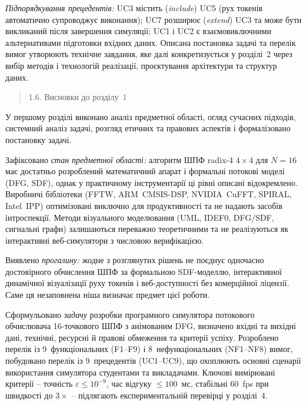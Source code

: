 \documentclass[
]{article}
\begin{document}
\emph{Підпорядкування прецедентів:} UC3 містить (\emph{include}) UC5
(рух токенів автоматично супроводжує виконання); UC7 розширює
(\emph{extend}) UC3 та може бути викликаний після завершення симуляції;
UC1 і UC2 є взаємовиключними альтернативами підготовки вхідних даних.
Описана постановка задачі та перелік вимог утворюють технічне завдання,
яке далі конкретизується у розділі~2 через вибір методів і технологій
реалізації, проєктування архітектури та структур даних.

\begin{quote}
\protect{}\label{ux432ux438ux441ux43dux43eux432ux43aux438-ux434ux43e-ux440ux43eux437ux434ux456ux43bux443-1}{}1.6.
Висновки до розділу~1
\end{quote}

У першому розділі виконано аналіз предметної області, огляд сучасних
підходів, системний аналіз задачі, розгляд етичних та правових аспектів
і формалізовано постановку задачі.

Зафіксовано \emph{стан предметної області:} алгоритм ШПФ radix-4
\(4 \times 4\) для \(N = 16\) має достатньо розроблений математичний
апарат і формальні потокові моделі (DFG, SDF), однак у практичному
інструментарії ці рівні описані відокремлено. Виробничі бібліотеки
(FFTW, ARM~CMSIS-DSP, NVIDIA~CuFFT, SPIRAL, Intel~IPP) оптимізовані
виключно для продуктивності та не надають засобів інтроспекції. Методи
візуального моделювання (UML, IDEF0, DFG/SDF, сигнальні графи)
залишаються переважно теоретичними та не реалізуються як інтерактивні
веб-симулятори з числовою верифікацією.

Виявлено \emph{прогалину:} жодне з розглянутих рішень не поєднує
одночасно достовірного обчислення ШПФ за формальною SDF-моделлю,
інтерактивної динамічної візуалізації руху токенів і веб-доступності без
комерційної ліцензії. Саме ця незаповнена ніша визначає предмет цієї
роботи.

Сформульовано \emph{задачу} розробки програмного симулятора потокового
обчислювача 16-точкового ШПФ з анімованим DFG, визначено вхідні та
вихідні дані, технічні, ресурсні й правові обмеження та критерії успіху.
Розроблено перелік із 9~функціональних (F1--F9) і 8~нефункціональних
(NF1--NF8) вимог, побудовано перелік із 9~прецедентів (UC1--UC9), що
охоплюють основні сценарії використання симулятора студентами та
викладачами. Ключові вимірювані критерії -- точність
\(\varepsilon \leq 10^{- 9}\), час відгуку \(\leq 100\)~мс, стабільні
60~fps при швидкості до \(3 \times\) -- підлягають експериментальній
перевірці у розділі~4.
\end{document}
